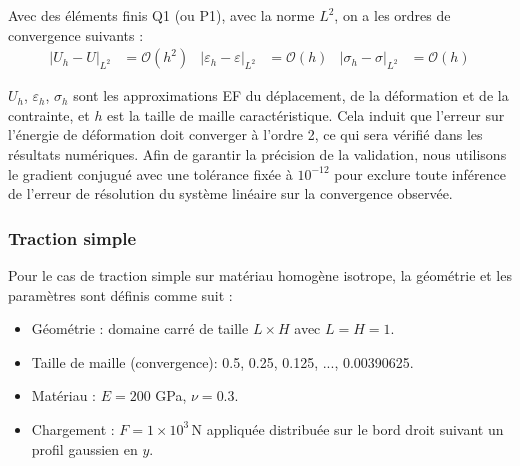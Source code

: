 \documentclass[a4paper,11pt]{article}
\begin{document}
Avec des éléments finis Q1 (ou P1), avec la norme $L^2$, on a les ordres de convergence suivants :
\begin{align}
    | U_h - U |_{L^2} &= \mathcal{O}(h^2) & | \varepsilon_h - \varepsilon |_{L^2} &= \mathcal{O}(h) & | \sigma_h - \sigma |_{L^2} &= \mathcal{O}(h)
\end{align}

$U_h$, $\varepsilon_h$, $\sigma_h$ sont les approximations EF du déplacement, de la déformation et de la contrainte, et $h$ est la taille de maille caractéristique. Cela induit que l'erreur sur l'énergie de déformation doit converger à l'ordre 2, ce qui sera vérifié dans les résultats numériques. Afin de garantir la précision de la validation, nous utilisons le gradient conjugué avec une tolérance fixée à $10^{-12}$ pour exclure toute inférence de l'erreur de résolution du système linéaire sur la convergence observée.

\subsubsection{Traction simple}

Pour le cas de traction simple sur matériau homogène isotrope, la géométrie et les paramètres sont définis comme suit :
\begin{itemize}
    \item Géométrie : domaine carré de taille $L \times H$ avec $L=H=1$.
    \item Taille de maille (convergence): 0.5, 0.25, 0.125, ..., 0.00390625.
    \item Matériau : $E=200$ GPa, $\nu=0.3$. 
    \item Chargement : $F=1\times10^{3}\,$N appliquée distribuée sur le bord droit suivant un profil gaussien en $y$.
\end{itemize}
\end{document}
